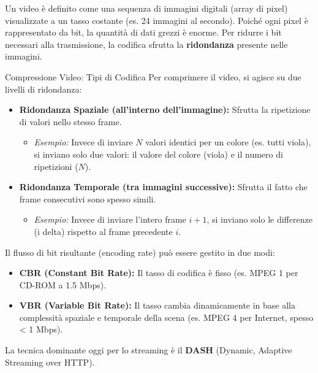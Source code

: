\documentclass[a4paper,12pt]{report}
\begin{document}
Un video è definito come una sequenza di immagini digitali (array di pixel) visualizzate a un tasso costante (es. 24 immagini al secondo). Poiché ogni pixel è rappresentato da bit, la quantità di dati grezzi è enorme. Per ridurre i bit necessari alla trasmissione, la codifica sfrutta la \textbf{ridondanza} presente nelle immagini.

\begin{defbox}{Compressione Video: Tipi di Codifica}
Per comprimere il video, si agisce su due livelli di ridondanza:

\begin{itemize}
    \item \textbf{Ridondanza Spaziale (all'interno dell'immagine):} Sfrutta la ripetizione di valori nello stesso frame.
    \begin{itemize}
        \item \textit{Esempio:} Invece di inviare $N$ valori identici per un colore (es. tutti viola), si inviano solo due valori: il valore del colore (viola) e il numero di ripetizioni ($N$).
    \end{itemize}
    
    \item \textbf{Ridondanza Temporale (tra immagini successive):} Sfrutta il fatto che frame consecutivi sono spesso simili.
    \begin{itemize}
        \item \textit{Esempio:} Invece di inviare l'intero frame $i+1$, si inviano solo le differenze (i delta) rispetto al frame precedente $i$.
    \end{itemize}
\end{itemize}

Il flusso di bit risultante (encoding rate) può essere gestito in due modi:
\begin{itemize}
    \item \textbf{CBR (Constant Bit Rate):} Il tasso di codifica è fisso (es. MPEG 1 per CD-ROM a 1.5 Mbps).
    \item \textbf{VBR (Variable Bit Rate):} Il tasso cambia dinamicamente in base alla complessità spaziale e temporale della scena (es. MPEG 4 per Internet, spesso < 1 Mbps).
\end{itemize}
\end{defbox}

La tecnica dominante oggi per lo streaming è il \textbf{DASH} (Dynamic, Adaptive Streaming over HTTP).
\end{document}

